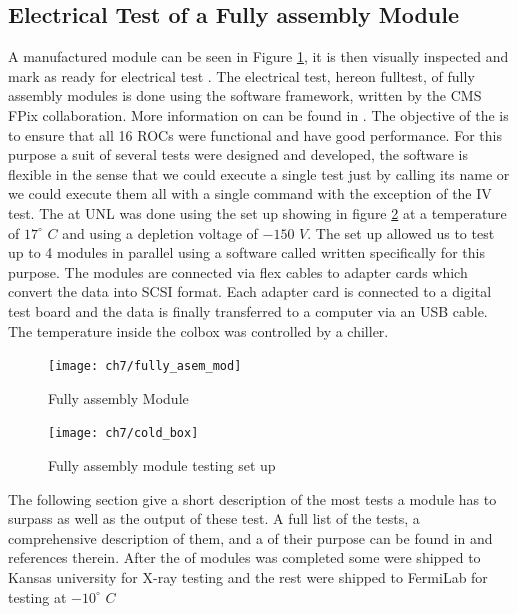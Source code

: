 \subsection{Electrical Test of a Fully assembly Module}
A manufactured module can be seen in Figure \ref{fig:fully_asem_mod}, it is then visually inspected and mark as ready for electrical test {}. 
The electrical test, hereon fulltest, of fully assembly modules is done using the  software framework, written by the CMS FPix collaboration. More information on  can be found in \cite{pxar}. The objective of the  is to ensure that all 16 ROCs were functional and have good performance. For this purpose a suit of several tests were designed and developed, the software is flexible in the sense that we could execute a single test just by calling its name or we could execute them all with a single command  with the exception of the IV test. The  at UNL was done using the set up showing in figure \ref{cold_box} at a temperature of $17^{\circ}$ $C$ and using a depletion voltage of $-150$ $V$. The set up allowed us to test up to 4 modules in parallel using a software called  \cite{elcomandante} written specifically for this purpose. The modules are connected via flex cables to adapter cards which convert the data into SCSI format. Each adapter card is connected to a digital test board and the data is finally transferred to a computer via an USB cable. The temperature inside the colbox was controlled by a chiller.

\begin{figure}[!h]
	\centering
	\texttt{[image: ch7/fully\_asem\_mod]}
	\caption[Fully assembly Module]{Fully assembly Module}
	\label{fig:fully_asem_mod}
\end{figure}

\begin{figure}[!h]
	\centering
	\texttt{[image: ch7/cold\_box]}
	\caption[Testing set up]{Fully assembly module testing set up}
	\label{cold_box}
\end{figure}

The following section {} give a short description of the most  tests a module has to surpass as well as the output of these test. A full list of the tests, a comprehensive description of them, and a {} of their purpose can be found in \cite{fpix_module_testing_guide} and references therein. After the  of modules was completed some were shipped to Kansas university for X-ray testing and the rest were shipped to FermiLab for testing at $-10^{\circ}$ $C$

